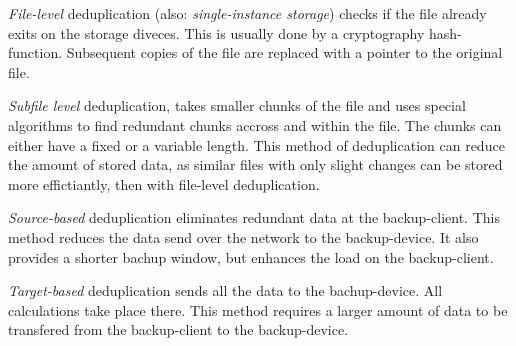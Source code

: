 \documentclass{article}
\begin{document}
	\emph{File-level} deduplication (also: \textsl{single-instance storage}) 
	checks if the file already exits on the storage diveces.
	This is usually done by a cryptography hash-function.
	Subsequent copies of the file are replaced with a pointer to the original file.

	\emph{Subfile level} deduplication,
	takes smaller chunks of the file
	and uses special algorithms to find redundant chunks accross and within the file.
	The chunks can either have a fixed or a variable length.
	This method of deduplication can reduce the amount of stored data,
	as similar files with only slight changes can be stored more effictiantly,
	then with file-level deduplication.

	\emph{Source-based} deduplication eliminates redundant data at the backup-client.
	This method reduces the data send over the network to the backup-device.
	It also provides a shorter bachup window,
	but enhances the load on the backup-client.

	\emph{Target-based} deduplication sends all the data to the bachup-device.
	All calculations take place there.
	This method requires a larger amount of data to be transfered from
	the backup-client to the backup-device.
\end{document}
